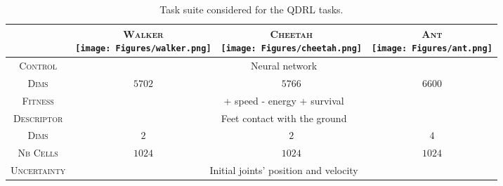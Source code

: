 \begin{table}[ht]
\centering
\small
  \caption{Task suite considered for the QDRL tasks.}
  \begin{tabular}{ c | c c c }

    & \makecell{\textsc{Walker} \\ \texttt{[image: Figures/walker.png]}}
    & \makecell{\textsc{Cheetah} \\ \texttt{[image: Figures/cheetah.png]}}
    & \makecell{\textsc{Ant} \\ \texttt{[image: Figures/ant.png]}}
    \\

    \midrule

    \textsc{Control} 
    & \multicolumn{3}{c}{Neural network}
    \\

    \textsc{Dims} 
    & $\mathit{5702}$
    & $\mathit{5766}$
    & $\mathit{6600}$
    \\

    \midrule

    \textsc{Fitness} 
    & \multicolumn{3}{c}{+ speed - energy + survival}
    \\

    \midrule
    
    \textsc{Descriptor} 
    & \multicolumn{3}{c}{Feet contact with the ground}
    \\


    \textsc{Dims} 
    & $\mathit{2}$
    & $\mathit{2}$
    & $\mathit{4}$
    \\

    \textsc{Nb Cells} 
    & $\mathit{1024}$
    & $\mathit{1024}$
    & $\mathit{1024}$
    \\

    \midrule
    
    \textsc{Uncertainty} 
    & \multicolumn{3}{c}{Initial joints' position and velocity}
    \\
  
  \end{tabular}
  \label{tab:tasks_qdrl}
\end{table}
